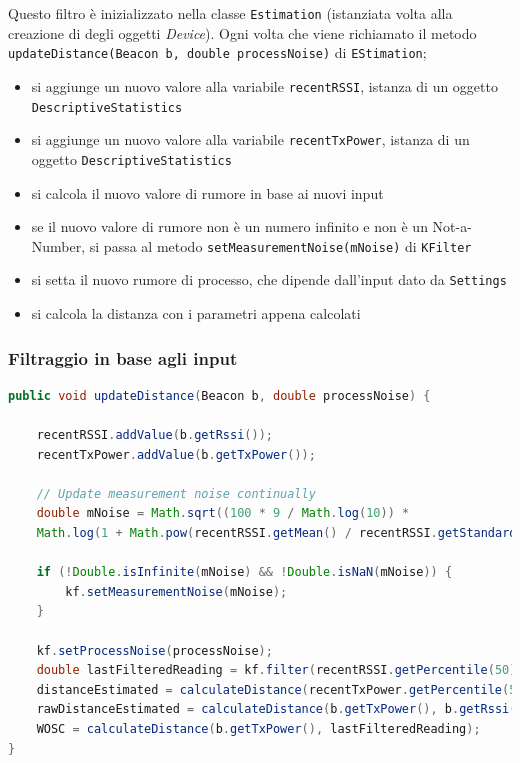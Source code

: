 Questo filtro è inizializzato nella classe \texttt{Estimation} (istanziata volta alla creazione di degli oggetti \textit{Device}). Ogni volta che viene richiamato il metodo \texttt{updateDistance(Beacon b, double processNoise)} di \texttt{EStimation};
\begin{itemize}
	\item si aggiunge un nuovo valore alla variabile \texttt{recentRSSI}, istanza di un oggetto \texttt{DescriptiveStatistics}
	\item si aggiunge un nuovo valore alla variabile \texttt{recentTxPower}, istanza di un oggetto \texttt{DescriptiveStatistics}
	\item si calcola il nuovo valore di rumore in base ai nuovi input
	\item se il nuovo valore di rumore non è un numero infinito e non è un Not-a-Number, si passa al metodo \texttt{setMeasurementNoise(mNoise)} di \texttt{KFilter}
	\item si setta il nuovo rumore di processo, che dipende dall'input dato da \texttt{Settings}
	\item si calcola la distanza con i parametri appena calcolati
\end{itemize}

\subsubsection{Filtraggio in base agli input}
\begin{lstlisting}[language=Java]
public void updateDistance(Beacon b, double processNoise) {
   	
   	recentRSSI.addValue(b.getRssi());
   	recentTxPower.addValue(b.getTxPower());
   	
   	// Update measurement noise continually
   	double mNoise = Math.sqrt((100 * 9 / Math.log(10)) *
   	Math.log(1 + Math.pow(recentRSSI.getMean() / recentRSSI.getStandardDeviation(), 2)));
   	
   	if (!Double.isInfinite(mNoise) && !Double.isNaN(mNoise)) {
   		kf.setMeasurementNoise(mNoise);
   	}
   	
   	kf.setProcessNoise(processNoise);
   	double lastFilteredReading = kf.filter(recentRSSI.getPercentile(50));
   	distanceEstimated = calculateDistance(recentTxPower.getPercentile(50), lastFilteredReading);
   	rawDistanceEstimated = calculateDistance(b.getTxPower(), b.getRssi());
   	WOSC = calculateDistance(b.getTxPower(), lastFilteredReading);
}
\end{lstlisting}

